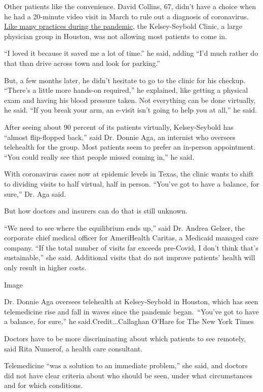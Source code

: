 Other patients like the convenience. David Collins, 67, didn't have a
choice when he had a 20-minute video visit in March to rule out a
diagnosis of coronavirus.
\href{https://www.nytimes3xbfgragh.onion/2020/03/11/health/telemedicine-coronavirus.html}{Like
many practices during the pandemic}, the Kelsey-Seybold Clinic, a large
physician group in Houston, was not allowing most patients to come in.

``I loved it because it saved me a lot of time.'' he said, adding ``I'd
much rather do that than drive across town and look for parking.''

But, a few months later, he didn't hesitate to go to the clinic for his
checkup. ``There's a little more hands-on required,'' he explained, like
getting a physical exam and having his blood pressure taken. Not
everything can be done virtually, he said. ``If you break your arm, an
e-visit isn't going to help you at all,'' he said.

After seeing about 90 percent of its patients virtually, Kelsey-Seybold
has ``almost flip-flopped back,'' said Dr. Donnie Aga, an internist who
oversees telehealth for the group. Most patients seem to prefer an
in-person appointment. ``You could really see that people missed coming
in,'' he said.

With coronavirus cases now at epidemic levels in Texas, the clinic wants
to shift to dividing visits to half virtual, half in person. ``You've
got to have a balance, for sure,'' Dr. Aga said.

But how doctors and insurers can do that is still unknown.

``We need to see where the equilibrium ends up,'' said Dr. Andrea
Gelzer, the corporate chief medical officer for AmeriHealth Caritas, a
Medicaid managed care company. ``If the total number of visits far
exceeds pre-Covid, I don't think that's sustainable,'' she said.
Additional visits that do not improve patients' health will only result
in higher costs.

Image

Dr. Donnie Aga oversees telehealth at Kelsey-Seybold in Houston, which
has seen telemedicine rise and fall in waves since the pandemic
began.~``You've got to have a balance, for sure,'' he
said.Credit...Callaghan O'Hare for The New York Times

Doctors have to be more discriminating about which patients to see
remotely, said Rita Numerof, a health care consultant.

Telemedicine ``was a solution to an immediate problem,'' she said, and
doctors did not have clear criteria about who should be seen, under what
circumstances and for which conditions.


